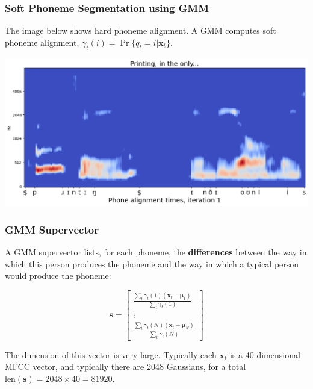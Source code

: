 \documentclass{beamer}
\begin{document}
\begin{frame}
  \frametitle{Soft Phoneme Segmentation using GMM}

  The image below shows hard phoneme alignment.  A GMM computes soft
  phoneme alignment, $\gamma_t(i)=\Pr\{q_t=i|\bm{x}_t\}$.
  \centerline{\includegraphics[width=\textwidth]{figs/segmentation.png}}
\end{frame}

\begin{frame}
  \frametitle{GMM Supervector}

  A GMM supervector lists, for each phoneme, the \textbf{differences}
  between the way in which this person produces the phoneme and the
  way in which a typical person would produce the phoneme:

  \begin{displaymath}
    \bm{s}=\left[\begin{array}{c}
        \frac{\sum_t\gamma_t(1)(\bm{x}_t-\bm{\mu}_1)}{\sum_t\gamma_t(1)}\\
        \vdots\\
        \frac{\sum_t\gamma_t(N)(\bm{x}_t-\bm{\mu}_N)}{\sum_t\gamma_t(N)}
      \end{array}\right]
  \end{displaymath}

  The dimension of this vector is very large.  Typically each
  $\bm{x}_t$ is a 40-dimensional MFCC vector, and typically there are
  2048 Gaussians, for a total $\text{len}(\bm{s})=2048\times 40=81920$.
\end{frame}
\end{document}
